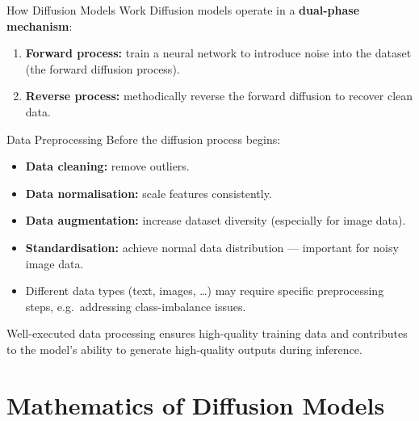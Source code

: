 \documentclass[aspectratio=169,10pt]{beamer}
\begin{document}
\begin{frame}{How Diffusion Models Work}
  Diffusion models operate in a \textbf{dual-phase mechanism}:
  \begin{enumerate}
    \item \textbf{Forward process:} train a neural network to introduce
          noise into the dataset (the forward diffusion process).
    \item \textbf{Reverse process:} methodically reverse the forward
          diffusion to recover clean data.
  \end{enumerate}
\end{frame}

\begin{frame}{Data Preprocessing}
  Before the diffusion process begins:
  \begin{itemize}
    \item \textbf{Data cleaning:} remove outliers.
    \item \textbf{Data normalisation:} scale features consistently.
    \item \textbf{Data augmentation:} increase dataset diversity
          (especially for image data).
    \item \textbf{Standardisation:} achieve normal data distribution —
          important for noisy image data.
    \item Different data types (text, images, \ldots) may require specific
          preprocessing steps, e.g.\ addressing class-imbalance issues.
  \end{itemize}
  Well-executed data processing ensures high-quality training data and
  contributes to the model's ability to generate high-quality outputs
  during inference.
\end{frame}

\section{Mathematics of Diffusion Models}
\end{document}
